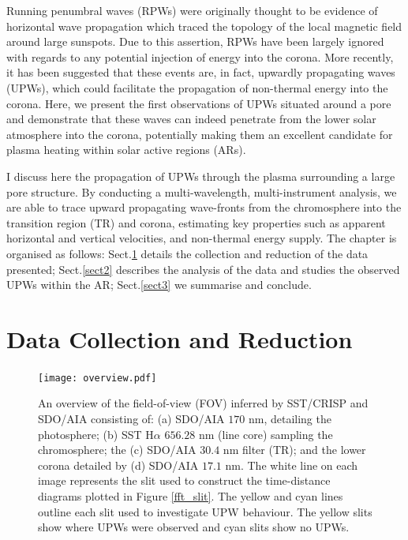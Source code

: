 	Running penumbral waves (RPWs) were originally thought to be evidence of horizontal wave propagation\citep{Zirin1972,Giovanelli1972,Bloomfiel2008} which traced the topology of the local magnetic field \citep{Zhugzhda1973,Nye1974} around large sunspots.
	Due to this assertion, RPWs have been largely ignored with regards to any potential injection of energy into the corona.
	More recently, it has been suggested that these events are, in fact, upwardly propagating waves (UPWs)\citep{OASO,Bloomfiel2008,Jess2013}, which could facilitate the propagation of non-thermal energy into the corona.
	Here, we present the first observations of UPWs situated around a pore and demonstrate that these waves can indeed penetrate from the lower solar atmosphere into the corona, potentially making them an excellent candidate for plasma heating within solar active regions (ARs).

	I discuss here the propagation of UPWs through the plasma surrounding a large pore structure.
	By conducting a multi-wavelength, multi-instrument analysis, we are able to trace upward propagating wave-fronts from the chromosphere into the transition region (TR) and corona, estimating key properties such as apparent horizontal and vertical velocities, and non-thermal energy supply.
	The chapter is organised as follows: Sect.\ref{sect1} details the collection and reduction of the data presented; Sect.\ref{sect2} describes the analysis of the data and studies the observed UPWs within the AR; Sect.\ref{sect3} we summarise and conclude.

\section{Data Collection and Reduction}
\label{sect1}

	\begin{figure}
		\centering
		\texttt{[image: overview.pdf]}
		\caption
		{
		An overview of the field-of-view (FOV) inferred by SST/CRISP and SDO/AIA consisting of:
		(a) SDO/AIA $170$ nm, detailing the photosphere; (b) SST H$\alpha$ $656.28$ nm (line core) sampling the chromosphere; the  (c) SDO/AIA $30.4$ nm filter (TR); and the lower corona detailed by (d) SDO/AIA $17.1$ nm.
		The white line on each image represents the slit used to construct the time-distance diagrams plotted in Figure \ref{fft_slit}.
		The yellow and cyan lines outline each slit used to investigate UPW behaviour.
	    The yellow slits show where UPWs were observed and cyan slits show no UPWs.
		}
		\label{chap5:overview}
	\end{figure}

